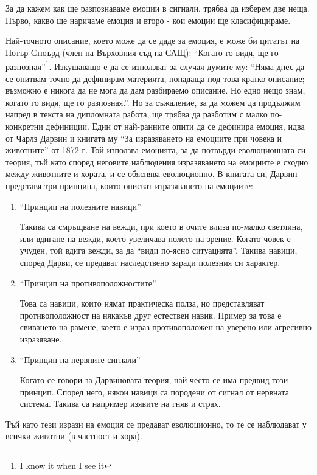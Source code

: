 \documentclass[main.tex]{subfiles}
\begin{document}
За да кажем как ще разпознаваме емоции в сигнали, трябва да изберем две неща. Първо, какво ще наричаме емоция и второ - кои емоции ще класифицираме.

Най-точното описание, което може да се даде за емоция, е може би цитатът на Потър Стюърд (член на Върховния съд на САЩ):  ``Когато го видя, ще го разпозная''\footnote{I know it when I see it}. Изкушаващо е да се използват за случая думите му: ``Няма днес да се опитвам точно да дефинирам материята, попадаща под това кратко описание; възможно е никога да не мога да дам разбираемо описание. Но едно нещо знам, когато го видя, ще го разпозная.''. Но за съжаление, за да можем да продължим напред в текста на дипломната работа, ще трябва да разботим с малко по-конкретни дефиниции.
Един от най-ранните опити да се дефинира емоция, идва от Чарлз Дарвин и книгата му ``За изразяването на емоциите при човека и животните'' от 1872 г. 
Той използва емоцията, за да потвърди еволюционната си теория, тъй като според неговите наблюдения изразяването на емоциите е сходно между животните и хората, и се обяснява еволюционно. В книгата си, Дарвин представя три принципа, които описват изразяването на емоциите:
\begin{enumerate}
    \item ``Принцип на полезните навици''
    
    Такива са смръщване на вежди, при което в очите влиза по-малко светлина, или вдигане на вежди, което увеличава полето на зрение. Когато човек е учуден, той вдига вежди, за да ``види по-ясно ситуацията''. Такива навици, според Дарви, се предават наследствено заради полезния си характер.
    \item ``Принцип на противоположностите''
    
    Това са навици, които нямат практическа полза, но представляват противоположност на някакъв друг естествен навик. Пример за това е свиването на рамене, което е израз противоположен на уверено или агресивно изразяване.
    
    \item ``Принцип на нервните сигнали''
    
    Когато се говори за Дарвиновата теория, най-често се има предвид този принцип. Според него, някои навици са породени от сигнал от нервната система. Такива са например изявите на гняв и страх.
\end{enumerate}

Тъй като тези изрази на емоция се предават еволюционно, то те се наблюдават у всички животни (в частност и хора). 
\end{document}
